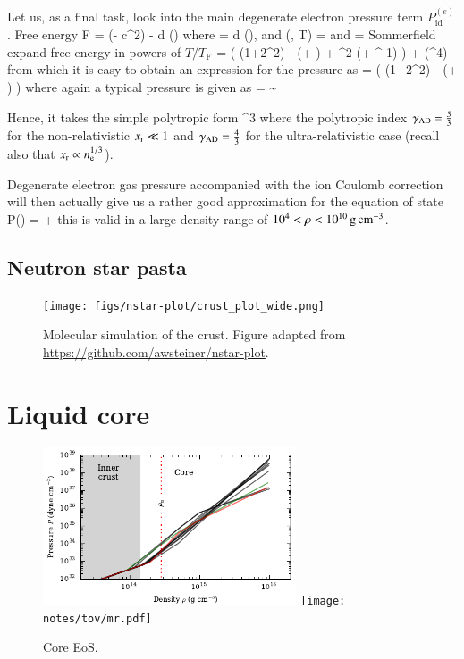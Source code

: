 Let us, as a final task, look into the main degenerate electron pressure term $P_{\mathrm{id}}^{(e)}$.
Free energy
\be
F = (\mu  - \me c^2) \nel -  \int d   \cdot {} \fFD(\epsilon)
\ee
where 
\be
\nel =  \int d \fFD(\epsilon),
\ee
and
\be
\fFD(\epsilon, T) = 
\ee
and
\be
\epsilon = 
\ee
Sommerfield expand free energy in powers of $T/T_{\mathrm{F}}$ 
\be
{} =    \left( \xr(1+2\xr^2) \gammar - \ln(\xr + \gammar) +  \tr^2 \xr(\gammar + \gammar^{-1})  \right)  + (\tr^4)
\ee
from which it is easy to obtain an expression for the pressure as
\be
\Peid =  \left( \xr(1+2\xr^2) \gammar - \ln(\xr + \gammar) \right)
\ee
where again a typical pressure is given as
\be
\Pressr =  \sim {} \dyncm
\ee

Hence, it takes the simple polytropic form
\be
\Peid \approx \frac{ \Pressr }{9\pi^2 \gammaad} \xr^{3\gammaad}
\ee
where the polytropic index $\gamma_{\mathrm{AD}} = \frac{5}{3}$ for the non-relativistic $x_{\mathrm{r}} \ll 1$ and $\gamma_{\mathrm{AD}} = \frac{4}{3}$ for the ultra-relativistic case (recall also that $x_{\mathrm{r}} \propto n_{\mathrm{e}}^{1/3}$).


Degenerate electron gas pressure accompanied with the ion Coulomb correction will then actually give us a rather good approximation for the equation of state
\be
P(\xr) = \Peid + \Pii
\ee
this is valid in a large density range of $10^{4} < \rho < 10^{10} \, \mathrm{g}\,\mathrm{cm}^{-3}$.


\subsection{Neutron star pasta}

\begin{figure}
\centering
\texttt{[image: figs/nstar-plot/crust\_plot\_wide.png]}
\caption{\label{fig:crust}
Molecular simulation of the crust.
Figure adapted from \url{https://github.com/awsteiner/nstar-plot}.
}
\end{figure}





\section{Liquid core}\label{sect:core}
\begin{figure}
\centering
\includegraphics[width=7.5cm]{notes/eos/dense_eos.pdf}
\texttt{[image: notes/tov/mr.pdf]}
\caption{\label{fig:core}
Core EoS.
}
\end{figure}

